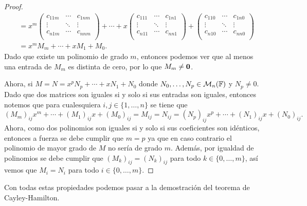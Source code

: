\begin{proof}
\begin{align*}
      &= x^m \begin{pmatrix}
        c_{11m} & \cdots & c_{1nm}   \\
        \vdots & \ddots & \vdots \\
        c_{n1m}  & \cdots & c_{nnm}  \\
        \end{pmatrix} + 
        \cdots
        + x \begin{pmatrix}
         c_{111} & \cdots &  c_{1n1} \\
        \vdots & \ddots & \vdots \\
         c_{n11}  & \cdots &  c_{nn1} \\
        \end{pmatrix}
        +\begin{pmatrix}
        c_{110} & \cdots &  c_{1n0}  \\
        \vdots & \ddots & \vdots \\
         c_{n10} & \cdots & c_{nn0}  \\
        \end{pmatrix} \\
      &= x^m M_m + \cdots + x M_1 + M_0.
    \end{align*}
  Dado que existe un polinomio de grado $m$, entonces podemos ver que al menos una entrada de $M_m$ es distinta de cero, por lo que $M_m \neq\mathbf{0}$.

  Ahora, si $M = N = x^p N_p + \cdots + x N_1  + N_0$ donde $N_0, \ldots, N_p \in \mathcal{M}_n(\mathbb{F})$ y $N_p \neq 0$. Dado que dos matrices son iguales si y solo si sus entradas son iguales, entonces notemos que para cualesquiera $i,j \in \{1,\ldots,n\}$ se tiene que
    \[
      (M_m)_{ij} x^m + \cdots + (M_1)_{ij}x + (M_0)_{ij} = M_{ij}
        =
      N_{ij} = (N_p)_{ij} x^p + \cdots + (N_1)_{ij}x + (N_0)_{ij}.
    \]
  Ahora, como dos polinomios son iguales si y solo si sus coeficientes son idénticos, entonces a fuerza se debe cumplir que $m = p$ ya que en caso contrario el polinomio de mayor grado de $M$ no sería de grado $m$. Además, por igualdad de polinomios se debe cumplir que $(M_k)_{ij} = (N_k)_{ij}$ para todo $k \in \{0,\ldots,m\}$, así vemos que $M_i = N_i$ para todo $i \in \{0,\ldots, m\}$.
\end{proof}

Con todas estas propiedades podemos pasar a la demostración del teorema de Cayley-Hamilton.

